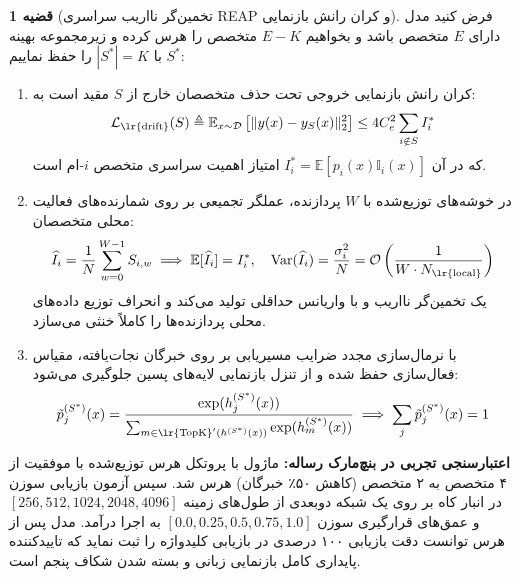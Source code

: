 \documentclass[12pt,a4paper]{report}
\theoremstyle{definition}
\newtheorem{theorem}{قضیه}[chapter]
\begin{document}
\begin{theorem}[تخمین‌گر نااریب سراسری REAP و کران رانش بازنمایی]
\label{thm:reap_unbiased_drift}
فرض کنید مدل  دارای $E$ متخصص باشد و بخواهیم $E - K$ متخصص را هرس کرده و زیرمجموعه بهینه $S^*$ با $|S^*| = K$ را حفظ نماییم:
\begin{enumerate}
    \item کران رانش بازنمایی خروجی تحت حذف متخصصان خارج از $S$ مقید است به:
    \begin{equation}
    \mathcal{L}_{\text{\lr{drift}}}(S) \triangleq \mathbb{E}_{x \sim \mathcal{D}}\left[ \| y(x) - y_S(x) \|_2^2 \right] \le 4 C_e^2 \sum_{i \notin S} I_i^*
    \end{equation}
    که در آن $I_i^* = \mathbb{E}[p_i(x) \mathbb{I}_i(x)]$ امتیاز اهمیت سراسری متخصص $i$-ام است.
    \item در خوشه‌های توزیع‌شده با $W$ پردازنده، عملگر تجمیعی  بر روی شمارنده‌های فعالیت محلی متخصصان:
    \begin{equation}
    \widehat{I}_i = \frac{1}{N} \sum_{w=0}^{W-1} S_{i, w} \implies \mathbb{E}[\widehat{I}_i] = I_i^*, \quad \operatorname{Var}(\widehat{I}_i) = \frac{\sigma_i^2}{N} = \mathcal{O}\left( \frac{1}{W \cdot N_{\text{\lr{local}}}} \right)
    \end{equation}
    یک تخمین‌گر نااریب  و با واریانس حداقلی تولید می‌کند و انحراف توزیع داده‌های محلی پردازنده‌ها را کاملاً خنثی می‌سازد.
    \item با نرمال‌سازی مجدد ضرایب مسیریابی بر روی خبرگان نجات‌یافته، مقیاس فعال‌سازی حفظ شده و از تنزل بازنمایی لایه‌های پسین جلوگیری می‌شود:
    \begin{equation}
    \tilde{p}_j^{(S^*)}(x) = \frac{\exp(h_j^{(S^*)}(x))}{\sum_{m \in \text{\lr{TopK}}'(h^{(S^*)}(x))} \exp(h_m^{(S^*)}(x))} \implies \sum_j \tilde{p}_j^{(S^*)}(x) = 1
    \end{equation}
\end{enumerate}
\end{theorem}

\textbf{اعتبارسنجی تجربی در بنچ‌مارک رساله:} ماژول  با پروتکل هرس توزیع‌شده با موفقیت از ۴ متخصص به ۲ متخصص (کاهش ۵۰٪ خبرگان) هرس شد. سپس آزمون بازیابی سوزن در انبار کاه  بر روی یک شبکه دوبعدی از طول‌های زمینه $[256, 512, 1024, 2048, 4096]$ و عمق‌های قرارگیری سوزن $[0.0, 0.25, 0.5, 0.75, 1.0]$ به اجرا درآمد. مدل پس از هرس توانست دقت بازیابی ۱۰۰ درصدی در بازیابی کلیدواژه  را ثبت نماید که تاییدکننده پایداری کامل بازنمایی زبانی و بسته شدن شکاف پنجم است.
\end{document}
